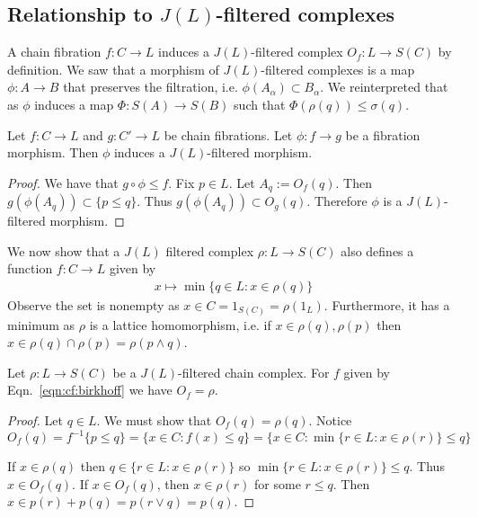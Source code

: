 \subsection{Relationship to $J(L)$-filtered complexes}

A chain fibration $f:C\to L$ induces a $J(L)$-filtered complex $O_f:L\to S(C)$ by definition. We saw that a morphism of $J(L)$-filtered complexes is a map $\phi:A\to B$ that preserves the filtration, i.e. $\phi(A_\alpha)\subset B_\alpha$.  We reinterpreted that as $\phi$ induces a map $\Phi:S(A)\to S(B)$ such that $\Phi(\rho(q))\leq \sigma(q)$.



\begin{prop}
Let $f:C\to L$ and $g:C'\to L$ be chain fibrations.  Let $\phi:f\to g$ be a fibration morphism.  Then $\phi$ induces a $J(L)$-filtered morphism.
\end{prop}
\begin{proof}
We have that $g\circ\phi \leq f$.  Fix $p\in L$.  Let $A_q := O_f(q)$.  Then $g(\phi(A_q))\subset \{p\leq q\}$.  Thus $g(\phi(A_q))\subset O_g(q)$.  Therefore $\phi$ is a $J(L)$-filtered morphism.  
\end{proof}


We now show that a $J(L)$ filtered complex $\rho:L\to S(C)$ also defines a function $f:C\to L$ given by 
\begin{align}\label{eqn:cf:birkhoff}
x\mapsto \min\{q\in L:x\in \rho(q)\}
\end{align}
Observe the set is nonempty as $x\in C=1_{S(C)}=\rho(1_L)$.  Furthermore, it has a minimum as $\rho$ is a lattice homomorphism, i.e. if $x\in \rho(q),\rho(p)$ then $x\in \rho(q)\cap \rho(p)=\rho(p\wedge q)$.  

\begin{prop}\label{prop:cf:birkhoff}
Let $\rho:L\to S(C)$ be a $J(L)$-filtered chain complex.  For $f$ given by Eqn.~\ref{eqn:cf:birkhoff} we have $O_f = \rho$. 
\end{prop}
\begin{proof}
 Let $q\in L$.  We must show that $O_f(q) = \rho (q)$.  Notice $$ O_f(q) = f^{-1}\{p\leq q\} = \{x\in C:f(x)\leq q\} = \{x\in C: \min\{r\in L: x\in \rho(r)\}\leq q\} $$

If $x\in \rho(q)$ then $q\in \{r\in L:x\in \rho(r)\}$ so $ \min \{r\in L:x\in \rho(r)\}\leq q$.  Thus $x\in O_f(q)$.  If $x\in O_f(q)$, then $x\in \rho(r)$ for some $r\leq q$.  Then $x\in p(r)+ p(q) = p(r\vee q ) = p(q)$.
\end{proof}

